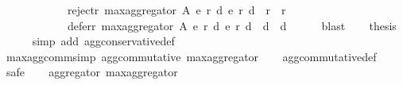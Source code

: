 \begin{isabellebody}
\ \ \ \ \ \ \ \ \ \ \ \ reject{\isacharunderscore}{\kern0pt}r\ {\isacharparenleft}{\kern0pt}max{\isacharunderscore}{\kern0pt}aggregator\ A\ {\isacharparenleft}{\kern0pt}e{}{\isacharcomma}{\kern0pt}\ r{}{\isacharcomma}{\kern0pt}\ d{}{\isacharparenright}{\kern0pt}\ {\isacharparenleft}{\kern0pt}e{}{\isacharcomma}{\kern0pt}\ r{}{\isacharcomma}{\kern0pt}\ d{}{\isacharparenright}{\kern0pt}{\isacharparenright}{\kern0pt}\ {\isasymsubseteq}\ {\isacharparenleft}{\kern0pt}r{}\ {\isasymunion}\ r{}{\isacharparenright}{\kern0pt}\ {\isasymand}\isanewline
\ \ \ \ \ \ \ \ \ \ \ \ defer{\isacharunderscore}{\kern0pt}r\ {\isacharparenleft}{\kern0pt}max{\isacharunderscore}{\kern0pt}aggregator\ A\ {\isacharparenleft}{\kern0pt}e{}{\isacharcomma}{\kern0pt}\ r{}{\isacharcomma}{\kern0pt}\ d{}{\isacharparenright}{\kern0pt}\ {\isacharparenleft}{\kern0pt}e{}{\isacharcomma}{\kern0pt}\ r{}{\isacharcomma}{\kern0pt}\ d{}{\isacharparenright}{\kern0pt}{\isacharparenright}{\kern0pt}\ {\isasymsubseteq}\ {\isacharparenleft}{\kern0pt}d{}\ {\isasymunion}\ d{}{\isacharparenright}{\kern0pt}{\isacharparenright}{\kern0pt}{\isachardoublequoteclose}\isanewline
\ \ \ \ \isamarkupfalse%
\ blast\isanewline
\ \ \isamarkupfalse%
\ {\isacharquery}{\kern0pt}thesis\isanewline
\ \ \ \ \isamarkupfalse%
\ {\isacharparenleft}{\kern0pt}simp\ add{\isacharcolon}{\kern0pt}\ agg{\isacharunderscore}{\kern0pt}conservative{\isacharunderscore}{\kern0pt}def{\isacharparenright}{\kern0pt}\isanewline
{}\isamarkupfalse%
%
\endisatagproof
{\isafoldproof}%
%
\isadelimproof
\isanewline
%
\endisadelimproof
\isanewline
\isanewline
{}\isamarkupfalse%
\ max{\isacharunderscore}{\kern0pt}agg{\isacharunderscore}{\kern0pt}comm{\isacharbrackleft}{\kern0pt}simp{\isacharbrackright}{\kern0pt}{\isacharcolon}{\kern0pt}\ {\isachardoublequoteopen}agg{\isacharunderscore}{\kern0pt}commutative\ max{\isacharunderscore}{\kern0pt}aggregator{\isachardoublequoteclose}\isanewline
%
\isadelimproof
\ \ %
\endisadelimproof
%
\isatagproof
{}\isamarkupfalse%
\ agg{\isacharunderscore}{\kern0pt}commutative{\isacharunderscore}{\kern0pt}def\isanewline
{}\isamarkupfalse%
\ {\isacharparenleft}{\kern0pt}safe{\isacharparenright}{\kern0pt}\isanewline
\ \ \isamarkupfalse%
\ {\isachardoublequoteopen}aggregator\ max{\isacharunderscore}{\kern0pt}aggregator{\isachardoublequoteclose}\isanewline

\end{isabellebody}
